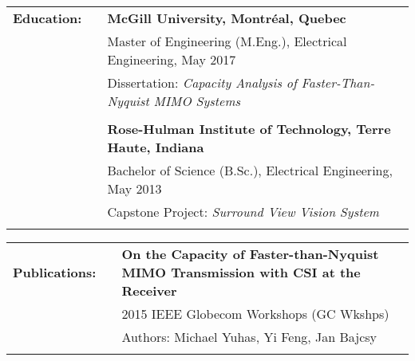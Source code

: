 \documentclass{minimal}
\begin{document}
\begin{CJK*}{UTF8}{}
\begin{tabular}{ p{1.5cm} p{1cm} p{16cm} }
\textbf{Education:} & & \textbf{McGill University, Montréal, Quebec} \\
& & Master of Engineering (M.Eng.), Electrical Engineering, May 2017\\
& & Dissertation: \textit{Capacity Analysis of Faster-Than-Nyquist MIMO Systems}\\
& & \\
& & \textbf{Rose-Hulman Institute of Technology, Terre Haute, Indiana} \\
& & Bachelor of Science (B.Sc.), Electrical Engineering, May 2013\\
& & Capstone Project: \textit{Surround View Vision System}\\
& & \\
\end{tabular}

\begin{tabular}{ p{1.5cm} p{1cm} p{16cm} }
\textbf{Publications:} & & \textbf{On the Capacity of Faster-than-Nyquist MIMO Transmission with CSI at the Receiver}\\
& & 2015 IEEE Globecom Workshops (GC Wkshps)\\
& & Authors: Michael Yuhas, Yi Feng, Jan Bajcsy\\
& & \\
\end{tabular}

\clearpage\end{CJK*} 
\end{document}
